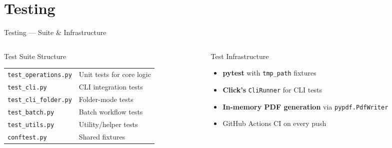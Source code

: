 \documentclass[aspectratio=169]{beamer}
\begin{document}
\section{Testing}

\begin{frame}{Testing --- Suite \& Infrastructure}
  \begin{columns}[T]
    \begin{column}{0.54\textwidth}
      \begin{block}{Test Suite Structure}
        \renewcommand{\arraystretch}{1.2}
        \begin{tabular}{ll}
          \texttt{test\_operations.py} & Unit tests for core logic \\
          \texttt{test\_cli.py}        & CLI integration tests \\
          \texttt{test\_cli\_folder.py}& Folder-mode tests \\
          \texttt{test\_batch.py}      & Batch workflow tests \\
          \texttt{test\_utils.py}      & Utility/helper tests \\
          \texttt{conftest.py}         & Shared fixtures \\
        \end{tabular}
      \end{block}
    \end{column}
    \begin{column}{0.42\textwidth}
      \begin{block}{Test Infrastructure}
        \begin{itemize}
          \item \textbf{pytest} with \texttt{tmp\_path} fixtures
          \item \textbf{Click's} \texttt{CliRunner} for CLI tests
          \item \textbf{In-memory PDF generation} via
                \texttt{pypdf.PdfWriter}
          \item GitHub Actions CI on every push
        \end{itemize}
      \end{block}
    \end{column}
  \end{columns}
\end{frame}
\end{document}
